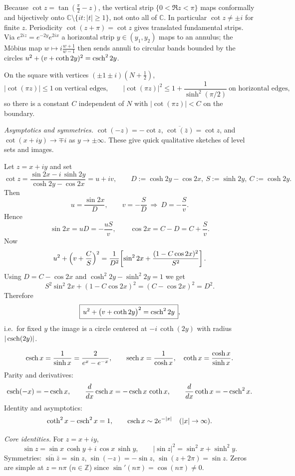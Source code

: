 \begin{problem}[CP-IV-0137]
\medskip

Because $\cot z=\tan(\tfrac{\pi}{2}-z)$, the vertical strip $\{0<\Re z<\pi\}$ maps conformally and bijectively onto $\mathbb C\setminus\{it:|t|\ge1\}$, not onto all of $\mathbb C$. In particular $\cot z\ne\pm i$ for finite $z$. Periodicity $\cot(z+\pi)=\cot z$ gives translated fundamental strips.
Via $e^{2iz}=e^{-2y}e^{2ix}$ a horizontal strip $y\in(y_1,y_2)$ maps to an annulus; the Möbius map $w\mapsto i\frac{w+1}{w-1}$ then sends annuli to circular bands bounded by the circles $u^2+(v+\operatorname{coth} 2y)^2=\operatorname{csch}^2 2y$.

\medskip

On the square with vertices $(\pm1\pm i)(N+\tfrac12)$,
\[
|\cot(\pi z)|\le 1 \ \text{on vertical edges},\qquad
|\cot(\pi z)|^2\le 1+\frac{1}{\sinh^2(\pi/2)} \ \text{on horizontal edges},
\]
so there is a constant $C$ independent of $N$ with $|\cot(\pi z)|<C$ on the boundary.

\medskip
\emph{Asymptotics and symmetries.}
$\cot(-z)=-\cot z$, $\overline{\cot(\bar z)}=\cot z$, and $\cot(x+iy)\to\mp i$ as $y\to\pm\infty$.
These give quick qualitative sketches of level sets and images.

Let $z=x+iy$ and set
\[
\cot z=\frac{\sin 2x-i\,\sinh 2y}{\cosh 2y-\cos 2x}=u+iv,\qquad
D:=\cosh 2y-\cos 2x,\ S:=\sinh 2y,\ C:=\cosh 2y.
\]
Then
\[
u=\frac{\sin 2x}{D},\qquad v=-\frac{S}{D}\ \Longrightarrow\ D=-\frac{S}{v}.
\]
Hence
\[
\sin 2x=uD=-\frac{uS}{v},\qquad \cos 2x = C - D = C+\frac{S}{v}.
\]
Now
\[
u^{2}+\Bigl(v+\frac{C}{S}\Bigr)^{2}
=\frac{1}{D^{2}}\!\left[\sin^{2}2x+\frac{(1-C\cos 2x)^{2}}{S^{2}}\right].
\]
Using $D=C-\cos 2x$ and $\cosh^{2}2y-\sinh^{2}2y=1$ we get
\[
S^{2}\sin^{2}2x+(1-C\cos 2x)^{2}=(C-\cos 2x)^{2}=D^{2}.
\]
Therefore
\[
\boxed{\,u^{2}+\bigl(v+\operatorname{coth} 2y\bigr)^{2}=\operatorname{csch}^{2}2y\,},
\]
i.e.\ for fixed $y$ the image is a circle centered at $-i\,\coth(2y)$ with radius $|\operatorname{csch}(2y)|$.

\[
\operatorname{csch} x=\frac{1}{\sinh x}=\frac{2}{e^{x}-e^{-x}},\qquad
\operatorname{sech} x=\frac{1}{\cosh x},\quad
\operatorname{coth} x=\frac{\cosh x}{\sinh x}.
\]
Parity and derivatives:
\[
\operatorname{csch}(-x)=-\operatorname{csch} x,\qquad
\frac{d}{dx}\operatorname{csch} x=-\operatorname{csch} x\,\operatorname{coth} x,\qquad
\frac{d}{dx}\operatorname{coth} x=-\operatorname{csch}^{2}x.
\]
Identity and asymptotics:
\[
\operatorname{coth}^{2}x-\operatorname{csch}^{2}x=1,\qquad
\operatorname{csch} x\sim 2e^{-|x|}\quad (|x|\to\infty).
\]

\emph{Core identities.} For $z=x+iy$,
\[
\sin z=\sin x\,\cosh y+i\,\cos x\,\sinh y,\qquad
|\sin z|^{2}=\sin^{2}x+\sinh^{2}y.
\]
Symmetries: $\overline{\sin\bar z}=\sin z$, $\sin(-z)=-\sin z$, $\sin(z+2\pi)=\sin z$.
Zeros are simple at $z=n\pi$ ($n\in\mathbb Z$) since $\sin'(n\pi)=\cos(n\pi)\neq0$.


\end{problem}
